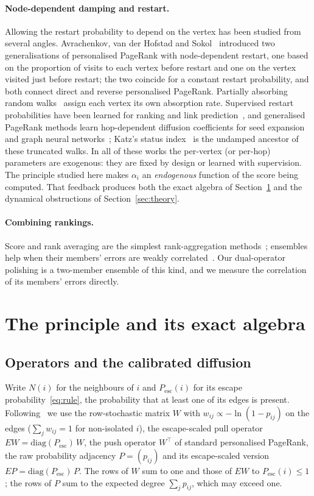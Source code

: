 \documentclass[11pt,a4paper]{article}
\theoremstyle{definition}
\theoremstyle{plain}
\newcommand{\Pesc}{P_{\mathrm{esc}}}
\newcommand{\diag}{\mathrm{diag}}
\begin{document}
\paragraph{Node-dependent damping and restart.} Allowing the restart probability to depend on the vertex has been studied from several angles. Avrachenkov, van der Hofstad and Sokol~\cite{avrachenkov14} introduced two generalisations of personalised PageRank with node-dependent restart, one based on the proportion of visits to each vertex before restart and one on the vertex visited just before restart; the two coincide for a constant restart probability, and both connect direct and reverse personalised PageRank. Partially absorbing random walks~\cite{wu12} assign each vertex its own absorption rate. Supervised restart probabilities have been learned for ranking and link prediction~\cite{jung19}, and generalised PageRank methods learn hop-dependent diffusion coefficients for seed expansion and graph neural networks~\cite{li19gpr,gprgnn21,berberidis19}; Katz's status index~\cite{katz53} is the undamped ancestor of these truncated walks. In all of these works the per-vertex (or per-hop) parameters are exogenous: they are fixed by design or learned with supervision. The principle studied here makes $\alpha_i$ an \emph{endogenous} function of the score being computed. That feedback produces both the exact algebra of Section~\ref{sec:principle} and the dynamical obstructions of Section~\ref{sec:theory}.

\paragraph{Combining rankings.} Score and rank averaging are the simplest rank-aggregation methods~\cite{dwork01}; ensembles help when their members' errors are weakly correlated~\cite{krogh95}. Our dual-operator polishing is a two-member ensemble of this kind, and we measure the correlation of its members' errors directly.

\section{The principle and its exact algebra}\label{sec:principle}

\subsection{Operators and the calibrated diffusion}\label{sec:operators}

Write $N(i)$ for the neighbours of $i$ and $\Pesc(i)$ for its escape probability~\eqref{eq:rule}, the probability that at least one of its edges is present. Following~\cite{konstantellos26} we use the row-stochastic matrix $W$ with $w_{ij}\propto-\ln(1-p_{ij})$ on the edges ($\sum_jw_{ij}=1$ for non-isolated $i$), the escape-scaled pull operator $EW=\diag(\Pesc)\,W$, the push operator $W^{\top}$ of standard personalised PageRank, the raw probability adjacency $P=(p_{ij})$ and its escape-scaled version $EP=\diag(\Pesc)\,P$. The rows of $W$ sum to one and those of $EW$ to $\Pesc(i)\le1$; the rows of $P$ sum to the expected degree $\sum_jp_{ij}$, which may exceed one.
\end{document}
